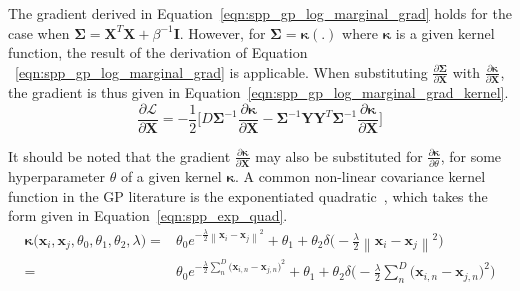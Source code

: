 The gradient derived in Equation~\ref{eqn:spp_gp_log_marginal_grad} holds 
for the case when \( \bm{\Sigma} = \bm{X}^{T}\bm{X} + \beta^{-1} \bm{I} \). 
However, for \( \bm{\Sigma} = \bm{\kappa}(.) \) where \( \bm{\kappa} \) is 
a given kernel function, the result of the derivation of Equation
~\ref{eqn:spp_gp_log_marginal_grad} is applicable. When substituting 
\( \frac{\partial \bm{\Sigma}}{\partial \bm{X}} \) with 
\( \frac{\partial \bm{\kappa}}{\partial \bm{X}} \), the gradient is thus 
given in Equation~\ref{eqn:spp_gp_log_marginal_grad_kernel}.
\begin{equation}
  \label{eqn:spp_gp_log_marginal_grad_kernel}
  \frac{\partial \mathcal{L}}{\partial \bm{X}} = 
  -\frac{1}{2} \Bigg[
    D \bm{\Sigma}^{-1} \frac{\partial \bm{\kappa}}{\partial \bm{X}}
    - \bm{\Sigma}^{-1} \bm{YY}^{T} \bm{\Sigma}^{-1} 
    \frac{\partial \bm{\kappa}}{\partial \bm{X}}
  \Bigg]
\end{equation}

It should be noted that the gradient \( \frac{\partial \bm{\kappa}}{\partial \bm{X}} \)
may also be substituted for \( \frac{\partial \bm{\kappa}}{\partial \theta} \), for 
some hyperparameter \( \theta \) of a given kernel \( \bm{\kappa} \). A common non-linear covariance 
kernel function in the GP literature is the exponentiated quadratic~\cite{Lawrence2005}, which takes 
the form given in Equation~\ref{eqn:spp_exp_quad}.
\begin{align}
  \label{eqn:spp_exp_quad}
  \bm{\kappa} \big( \bm{x}_{i}, \bm{x}_{j}, \theta_{0}, 
  \theta_{1}, \theta_{2}, \lambda \big) ={}&
  \theta_{0} e^{-\frac{\lambda}{2} 
  \left\lVert \bm{x}_{i} - \bm{x}_{j} \right\rVert^{2}}
  + \theta_{1} + \theta_{2} \delta \big( -\frac{\lambda}{2} 
  \left\lVert \bm{x}_{i} - \bm{x}_{j} \right\rVert^{2} \big)\\
  ={}& \theta_{0} e^{-\frac{\lambda}{2} 
  \sum_{n}^{D} {\big( \bm{x}_{i, n} - \bm{x}_{j, n} \big)}^{2}}
  + \theta_{1} + \theta_{2} \delta \big( -\frac{\lambda}{2} 
  \sum_{n}^{D} {\big( \bm{x}_{i, n} - \bm{x}_{j, n} \big)}^{2} \big)
\end{align}

